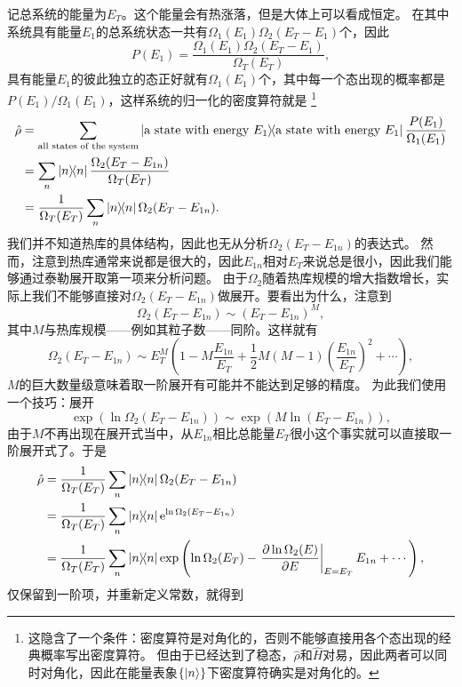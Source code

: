 \documentclass[hyperref, UTF8, a4paper]{ctexart}
\newcommand*{\ee}{\mathrm{e}}
\begin{document}
记总系统的能量为$E_T$。这个能量会有热涨落，但是大体上可以看成恒定。
在其中系统具有能量$E_1$的总系统状态一共有$\Omega_1 (E_1) \Omega_2 (E_T - E_1)$个，因此
\begin{equation}
    P(E_1) = \frac{\Omega_1(E_1) \Omega_2(E_T-E_1)}{\Omega_T(E_T)},
\end{equation}
具有能量$E_1$的彼此独立的态正好就有$\Omega_1(E_1)$个，其中每一个态出现的概率都是$P(E_1) / \Omega_1 (E_1)$，这样系统的归一化的密度算符就是%
\footnote{这隐含了一个条件：密度算符是对角化的，否则不能够直接用各个态出现的经典概率写出密度算符。
但由于已经达到了稳态，$\hat{\rho}$和$\hat{H}$对易，因此两者可以同时对角化，因此在能量表象$\{\ket{n}\}$下密度算符确实是对角化的。}
\[
    \begin{aligned}
        \hat{\rho} &= \sum_{\text{all states of the system}} \dyad{\text{a state with energy $E_1$}} \frac{P(E_1)}{\Omega_1 (E_1)} \\
        &= \sum_n \dyad{n} \frac{\Omega_2 (E_T - E_{1n})}{\Omega_T(E_T)} \\
        &= \frac{1}{\Omega_T(E_T)} \sum_{n} \dyad{n} \Omega_2 (E_T - E_{1n}).
    \end{aligned}
\]
我们并不知道热库的具体结构，因此也无从分析$\Omega_2(E_T-E_{1n})$的表达式。
然而，注意到热库通常来说都是很大的，因此$E_{1n}$相对$E_T$来说总是很小，因此我们能够通过泰勒展开取第一项来分析问题。
由于$\Omega_2$随着热库规模的增大指数增长，实际上我们不能够直接对$\Omega_2 (E_T - E_{1n})$做展开。要看出为什么，注意到
\[
    \Omega_2 (E_T - E_{1n}) \sim (E_T - E_{1n})^M,
\]
其中$M$与热库规模——例如其粒子数——同阶。这样就有
\[
    \Omega_2 (E_T - E_{1n}) \sim E_T^M \left( 1 - M \frac{E_{1n}}{E_T} + \frac{1}{2} M (M-1) \left(\frac{E_{1n}}{E_T}\right)^2 + \cdots \right),
\]
$M$的巨大数量级意味着取一阶展开有可能并不能达到足够的精度。
为此我们使用一个技巧：展开
\[
    \exp(\ln \Omega_2(E_T-E_{1n})) \sim \exp \left( M \ln (E_T - E_{1n}) \right),
\]
由于$M$不再出现在展开式当中，从$E_{1n}$相比总能量$E_T$很小这个事实就可以直接取一阶展开式了。于是
\[
    \begin{aligned}
        \hat{\rho} &= \frac{1}{\Omega_T(E_T)} \sum_{n} \dyad{n} \Omega_2 (E_T - E_{1n}) \\
        &= \frac{1}{\Omega_T(E_T)} \sum_{n} \dyad{n} \ee^{\ln \Omega_2 (E_T - E_{1n})} \\
        &= \frac{1}{\Omega_T(E_T)} \sum_{n} \dyad{n} \exp \left( \ln \Omega_2 (E_T) - \eval{\pdv{\ln \Omega_2 (E)}{E}}_{E=E_T} E_{1n} + \cdots \right),
    \end{aligned}
\]
仅保留到一阶项，并重新定义常数，就得到
\end{document}
